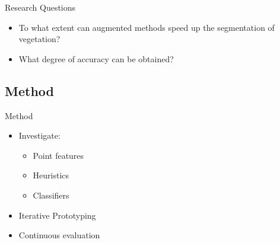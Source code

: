 \documentclass{beamer}
\begin{document}
\begin{frame}{Research Questions}

\begin{itemize}
\item To what extent can augmented methods speed up the segmentation of vegetation?
\item What degree of accuracy can be obtained?
\end{itemize}

\end{frame}

\subsection{Method}

\begin{frame}{Method}

\begin{itemize}
\item Investigate:
\begin{itemize}
  \item Point features
  \item Heuristics
  \item Classifiers
\end{itemize}
\item Iterative Prototyping
\item Continuous evaluation
\end{itemize}

\end{frame}
\end{document}
